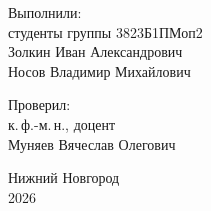 \begin{titlepage}
\hfill
\begin{minipage}[t]{0.42\linewidth}
\raggedright

Выполнили:\\
студенты группы 3823Б1ПМоп2\\
Золкин Иван Александрович\\
Носов Владимир Михайлович

\vspace{1.5em}

Проверил:\\
к.\,ф.-м.\,н., доцент\\
Муняев Вячеслав Олегович

\end{minipage}

\vfill

\begin{center}
Нижний Новгород\\
2026
\end{center}

\end{titlepage}